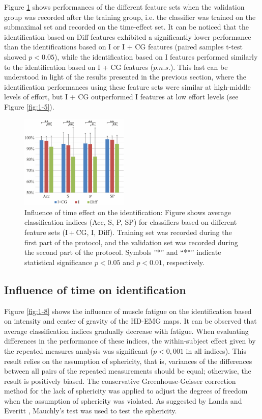 Figure \ref{fig:1-7} shows performances of the different feature sets when the validation group was recorded after the training group, i.e. the classifier was trained on the submaximal set and recorded on the time-effect set. It can be noticed that the identification based on Diff features exhibited a significantly lower performance than the identifications based on I or I + CG features (paired samples t-test showed $p < 0.05$), while the identification based on I features performed similarly to the identification based on I + CG features ($p.n.s.$). This last can be understood in light of the results presented in the previous section, where the identification performances using these feature sets were similar at high-middle levels of effort, but I + CG outperformed I features at low effort levels (see Figure \ref{fig:1-5}).

\begin{figure}[ht]
\centering
\includegraphics[width=0.459\textwidth]{Images/figure1_7.png}
\caption{Influence of time effect on the identification: Figure shows average classification indices (Acc, S, P, SP) for classifiers based on different feature sets (I + CG, I, Diff). Training set was recorded during the first part of the protocol, and the validation set was recorded during the second part of the protocol. Symbols ”*” and “**” indicate statistical significance $p < 0.05$ and $p < 0.01$, respectively.}
\label{fig:1-7}
\end{figure}      

\subsection{Influence of time on identification}
Figure \ref{fig:1-8} shows the influence of muscle fatigue on the identification based on intensity and center of gravity of the HD-EMG maps. It can be observed that average classification indices gradually decrease with fatigue. When evaluating differences in the performance of these indices, the within-subject effect given by the repeated measures analysis was significant ($p < 0,001$ in all indices). This result relies on the assumption of sphericity, that is, variances of the differences between all pairs of the repeated measurements should be equal; otherwise, the result is positively biased. The conservative Greenhouse-Geisser correction method for the lack of sphericity \citep{Greenhouse1959} was applied to adjust the degrees of freedom \citep{Landa2004, Loftus1994} when the assumption of sphericity was violated. As suggested by Landa and Everitt \citep{Landa2004}, Mauchly’s test was used to test the sphericity.

